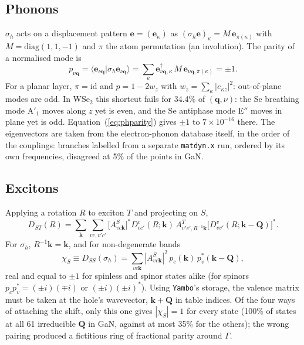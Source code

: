 \documentclass[10pt,a4paper]{article}
\newcommand{\bq}{\mathbf{q}}
\newcommand{\bQ}{\mathbf{Q}}
\newcommand{\bk}{\mathbf{k}}
\begin{document}
\subsection{Phonons}
$\sigma_h$ acts on a displacement pattern $\mathbf{e}=(\mathbf{e}_\kappa)$ as
$(\sigma_h\mathbf{e})_\kappa=M\,\mathbf{e}_{\pi(\kappa)}$ with $M=\mathrm{diag}(1,1,-1)$
and $\pi$ the atom permutation (an involution). The parity of a normalised mode
is
\begin{equation}
p_{\nu\bq}=\langle\mathbf{e}_{\nu\bq}|\sigma_h\mathbf{e}_{\nu\bq}\rangle
=\sum_\kappa\mathbf{e}_{\nu\bq,\kappa}^{\dagger}\,M\,\mathbf{e}_{\nu\bq,\pi(\kappa)}=\pm1 .
\label{eq:phparity}
\end{equation}
For a planar layer, $\pi=\mathrm{id}$ and $p=1-2w_z$ with
$w_z=\sum_\kappa|e_{\kappa z}|^2$: out-of-plane modes are odd. In WSe$_2$ this
shortcut fails for 34.4\% of $(\bq,\nu)$: the Se breathing mode A$'_1$ moves
along $z$ yet is even, and the Se antiphase mode E$''$ moves in plane yet is odd.
Equation~(\ref{eq:phparity}) gives $\pm1$ to $7\times10^{-16}$ there. The
eigenvectors are taken from the electron-phonon database itself, in the order of
the couplings: branches labelled from a separate \texttt{matdyn.x} run,
ordered by its own frequencies, disagreed at 5\% of the points in GaN.

\subsection{Excitons}
\label{sec:excparity}
Applying a rotation $R$ to exciton $T$ and projecting on $S$,
\begin{equation}
D_{ST}(R)=\sum_{\bk}\sum_{vc,v'c'}\bigl[A^{S}_{vc\bk}\bigr]^{*}D^{c}_{cc'}(R;\bk)\,
A^{T}_{v'c',R^{-1}\bk}\bigl[D^{v}_{vv'}(R;\bk-\bQ)\bigr]^{*}.
\label{eq:Dexc}
\end{equation}
For $\sigma_h$, $R^{-1}\bk=\bk$, and for non-degenerate bands
\begin{equation}
\chi_S\equiv D_{SS}(\sigma_h)=\sum_{vc\bk}|A^S_{vc\bk}|^2\,p_c(\bk)\,p_v^{*}(\bk-\bQ),
\label{eq:chi}
\end{equation}
real and equal to $\pm1$ for spinless and spinor states alike (for spinors
$p_cp_v^*=(\pm i)(\mp i)$ or $(\pm i)(\pm i)^*$). Using \texttt{Yambo}'s
storage, the valence matrix must be taken at the hole's wavevector, $\bk+\bQ$ in
table indices. Of the four ways of attaching the shift, only this one gives
$|\chi_S|=1$ for every state (100\% of states at all 61 irreducible $\bQ$ in GaN,
against at most 35\% for the others); the wrong pairing produced a fictitious
ring of fractional parity around $\Gamma$.
\end{document}
